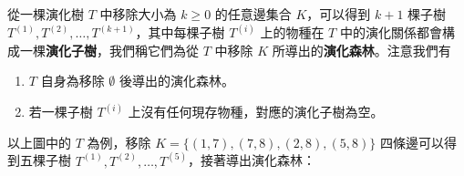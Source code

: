 從一棵演化樹 \(T\) 中移除大小為 \(k \ge 0\) 的任意邊集合 \(K\)，可以得到
\(k+1\) 棵子樹 \(T^{(1)}, T^{(2)}, \ldots, T^{(k+1)}\)，其中每棵子樹
\(T^{(i)}\) 上的物種在 \(T\)
中的演化關係都會構成一棵\textbf{演化子樹}，我們稱它們為從 \(T\) 中移除
\(K\) 所導出的\textbf{演化森林}。注意我們有

\begin{enumerate}
\def\labelenumi{\arabic{enumi}.}
\tightlist
\item
  \(T\) 自身為移除 \(\emptyset\) 後導出的演化森林。
\item
  若一棵子樹 \(T^{(i)}\) 上沒有任何現存物種，對應的演化子樹為空。
\end{enumerate}

\noindent 以上圖中的 \(T\) 為例，移除
\(K = \{(1, 7), (7, 8), (2, 8), (5, 8)\}\) 四條邊可以得到五棵子樹
\(T^{(1)}, T^{(2)}, \ldots, T^{(5)}\)，接著導出演化森林：

\newpage

